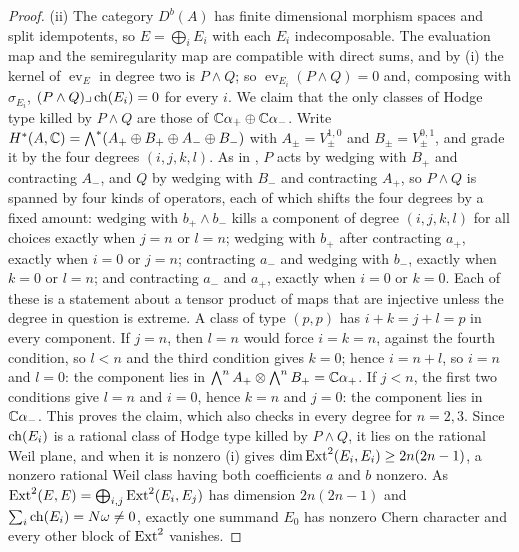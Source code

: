 \begin{proof}
(ii) The category $D^{b}(A)$ has finite dimensional morphism spaces and split
idempotents, so $E=\bigoplus_{i}E_{i}$ with each $E_{i}$ indecomposable. The
evaluation map and the semiregularity map are compatible with direct sums,
and by (i) the kernel of $\operatorname{ev}_{E}$ in
degree two is $P\wedge Q$; so $\operatorname{ev}_{E_{i}}(P\wedge Q)=0$ and,
composing with $\sigma_{E_{i}}$, $(P\wedge Q)\lrcorner\operatorname{ch}(E_{i})=0$ for every
$i$. We claim that the only classes of Hodge type killed by $P\wedge Q$ are
those of $\mathbb{C}\alpha_{+}\oplus\mathbb{C}\alpha_{-}$. Write
$H^{*}(A,\mathbb{C})=\bigwedge^{*}(A_{+}\oplus B_{+}\oplus A_{-}\oplus B_{-})$ with
$A_{\pm}=V_{\pm}^{1,0}$ and $B_{\pm}=V_{\pm}^{0,1}$, and grade it by the four
degrees $(i,j,k,l)$. As in , $P$ acts by wedging with $B_{+}$
and contracting $A_{-}$, and $Q$ by wedging with $B_{-}$ and contracting
$A_{+}$, so $P\wedge Q$ is spanned by four kinds of operators, each of which
shifts the four degrees by a fixed amount: wedging with $b_{+}\wedge b_{-}$
kills a component of degree $(i,j,k,l)$ for all choices exactly when $j=n$ or
$l=n$; wedging with $b_{+}$ after contracting $a_{+}$, exactly when $i=0$ or
$j=n$; contracting $a_{-}$ and wedging with $b_{-}$, exactly when $k=0$ or
$l=n$; and contracting $a_{-}$ and $a_{+}$, exactly when $i=0$ or $k=0$. Each
of these is a statement about a tensor product of maps that are injective
unless the degree in question is extreme. A class of type $(p,p)$ has
$i+k=j+l=p$ in every component. If $j=n$, then $l=n$ would force $i=k=n$,
against the fourth condition, so $l<n$ and the third condition gives $k=0$;
hence $i=n+l$, so $i=n$ and $l=0$: the component lies in
$\bigwedge^{n}A_{+}\otimes\bigwedge^{n}B_{+}=\mathbb{C}\alpha_{+}$. If $j<n$, the
first two conditions give $l=n$ and $i=0$, hence $k=n$ and $j=0$: the
component lies in $\mathbb{C}\alpha_{-}$. This proves the claim, which \cite{BMB26} also
checks in every degree for $n=2,3$. Since $\operatorname{ch}(E_{i})$ is a rational class of
Hodge type killed by $P\wedge Q$, it lies on the rational Weil plane, and
when it is nonzero (i) gives
$\dim\operatorname{Ext}^{2}(E_{i},E_{i})\ge2n(2n-1)$, a nonzero rational Weil class having
both coefficients $a$ and $b$ nonzero. As
$\operatorname{Ext}^{2}(E,E)=\bigoplus_{i,j}\operatorname{Ext}^{2}(E_{i},E_{j})$ has dimension
$2n(2n-1)$ and $\sum_{i}\operatorname{ch}(E_{i})=N\omega\ne0$, exactly one summand $E_{0}$
has nonzero Chern character and every other block of $\operatorname{Ext}^{2}$ vanishes.


\end{proof}
